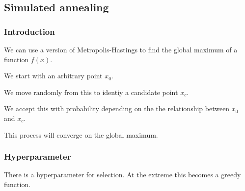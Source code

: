 
\subsection{Simulated annealing}

\subsubsection{Introduction}

We can use a version of Metropolis-Hastings to find the global maximum of a function \(f(x)\).

We start with an arbitrary point \(x_0\).

We move randomly from this to identiy a candidate point \(x_c\).

We accept this with probability depending on the the relationship between \(x_0\) and \(x_c\).

This process will converge on the global maximum.

\subsubsection{Hyperparameter}

There is a hyperparameter for selection. At the extreme this becomes a greedy function.

